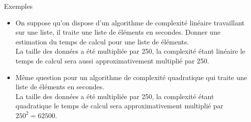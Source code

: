 \documentclass[10pt]{beamer}
\begin{document}
\begin{frame}[fragile]{\Ctitle}{\stitle}
	\begin{exampleblock}{Exemples}
		\begin{itemize}
			\item<1-> On suppose qu'on dispose d'un algorithme de complexité linéaire travaillant sur une liste, il traite une liste de  éléments en  secondes. Donner une estimation du temps de calcul pour une liste de  éléments.\\
				\onslide<2-> {\textcolor{OliveGreen}{La taille des données a été multipliée par 250, la complexité étant linéaire le temps de calcul sera aussi approximativement multiplié par 250. \\}}
				\onslide<3->{\textcolor{OliveGreen}{$0.015 \times 250 = 3.75$, on peut donc prévoir un temps de calcul d'environ 3,75 secondes.}}
			\item<4-> Même question pour un algorithme de complexité quadratique qui traite une liste de  éléments en  secondes.\\
				\onslide<5-> {\textcolor{OliveGreen}{La taille des données a été multipliée par 250, la complexité étant quadratique le temps de calcul sera approximativement multiplié par $250^2=62500$. \\}}
				\onslide<6->{\textcolor{OliveGreen}{$0.07 \times 62\,500 = 4375$, on peut donc prévoir un temps de calcul d'environ $4\,375$ secondes, c'est-à-dire près d'une heure et 15 minutes !}}
		\end{itemize}
	\end{exampleblock}
\end{frame}
\end{document}
